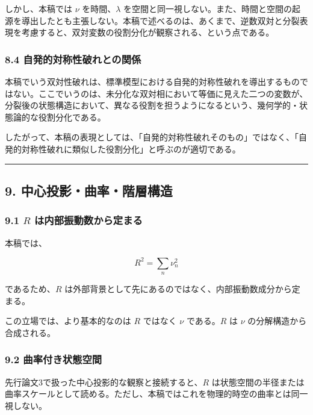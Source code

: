 \documentclass[
]{ltjsarticle}
\begin{document}
しかし、本稿では \(\nu\) を時間、\(\lambda\)
を空間と同一視しない。また、時間と空間の起源を導出したとも主張しない。本稿で述べるのは、あくまで、逆数双対と分裂表現を考慮すると、双対変数の役割分化が観察される、という点である。

\subsubsection{8.4
自発的対称性破れとの関係}\label{ux81eaux767aux7684ux5bfeux79f0ux6027ux7834ux308cux3068ux306eux95a2ux4fc2}

本稿でいう双対性破れは、標準模型における自発的対称性破れを導出するものではない。ここでいうのは、未分化な双対相において等価に見えた二つの変数が、分裂後の状態構造において、異なる役割を担うようになるという、幾何学的・状態論的な役割分化である。

したがって、本稿の表現としては、「自発的対称性破れそのもの」ではなく、「自発的対称性破れに類似した役割分化」と呼ぶのが適切である。

\begin{center}\rule{0.5\linewidth}{0.5pt}\end{center}

\subsection{9.
中心投影・曲率・階層構造}\label{ux4e2dux5fc3ux6295ux5f71ux66f2ux7387ux968eux5c64ux69cbux9020}

\subsubsection{\texorpdfstring{9.1 \(R\)
は内部振動数から定まる}{9.1 R は内部振動数から定まる}}\label{r-ux306fux5185ux90e8ux632fux52d5ux6570ux304bux3089ux5b9aux307eux308b}

本稿では、

\[
R^2=\sum_n\nu_n^2
\]

であるため、\(R\)
は外部背景として先にあるのではなく、内部振動数成分から定まる。

この立場では、より基本的なのは \(R\) ではなく \(\nu\) である。\(R\) は
\(\nu\) の分解構造から合成される。

\subsubsection{9.2
曲率付き状態空間}\label{ux66f2ux7387ux4ed8ux304dux72b6ux614bux7a7aux9593}

先行論文3で扱った中心投影的な観察と接続すると、\(R\)
は状態空間の半径または曲率スケールとして読める。ただし、本稿ではこれを物理的時空の曲率とは同一視しない。
\end{document}
